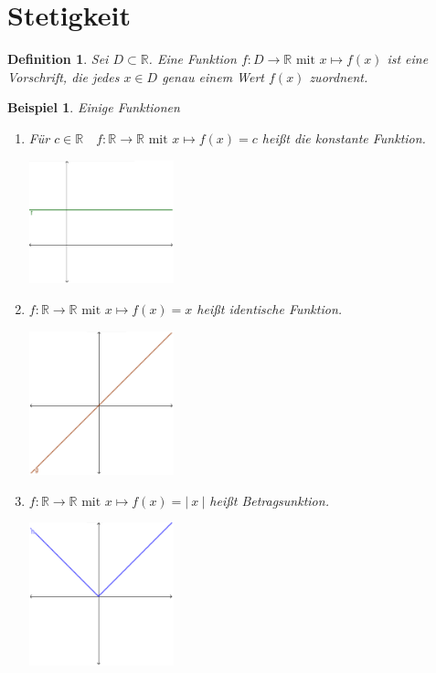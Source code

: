 \documentclass[a4paper,titlepage,oneside]{article}
\def\R{\ensuremath{\mathbb{R}} }
\newcommand{\abs}[1]{\ensuremath{\left|\:#1\:\right|}}
\theoremstyle{thmstyle}
\newtheorem{defi}[satz]{Definition}
\newtheorem{bsp}[satz]{Beispiel}
\theoremstyle{subthmstyle}
\begin{document}
\section{Stetigkeit}
\begin{defi}
Sei $ D \subset \R$. Eine Funktion $f : D \to \R \text{ mit } x \mapsto f(x) $ ist eine Vorschrift, die jedes $ x \in D$ genau einem Wert $f(x)$ zuordnent.
\end{defi}

\begin{bsp}
Einige Funktionen
\begin{enumerate}
\item Für $ c \in \R \quad f : \R \to \R \text{ mit } x \mapsto f(x) = c $ heißt die konstante Funktion.
\begin{center}
 \includegraphics[width=0.33\textwidth]{images/konstante_funktion.png}
\end{center}
\item $f : \R \to \R \text{ mit } x \mapsto f(x) = x $ heißt identische Funktion. 
\begin{center}
 \includegraphics[width=0.33\textwidth]{images/identische_funktion.png}
\end{center}
\item $f : \R \to \R \text{ mit } x \mapsto f(x) = \abs{x} $ heißt Betragsunktion.
\begin{center}
 \includegraphics[width=0.33\textwidth]{images/betrags_funktion.png}

\end{center}
\end{enumerate}
\end{bsp}
\end{document}
